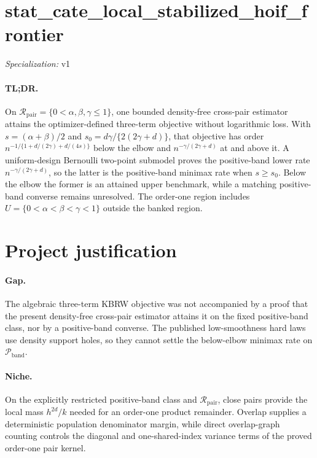 \documentclass{article}
\begin{document}
\sloppy

\section*{stat\_\allowbreak{}cate\_\allowbreak{}local\_\allowbreak{}stabilized\_\allowbreak{}hoif\_\allowbreak{}frontier}

\noindent\textit{Specialization:} v1\par

\paragraph{TL;DR.} On \(\mathcal R_{\mathrm{pair}}=\{0<\alpha,\beta,\gamma\leq1\}\), one bounded density-free cross-pair estimator attains the optimizer-defined three-term objective without logarithmic loss.  With \(s=(\alpha+\beta)/2\) and \(s_0=d\gamma/\{2(2\gamma+d)\}\), that objective has order \(n^{-1/\{1+d/(2\gamma)+d/(4s)\}}\) below the elbow and \(n^{-\gamma/(2\gamma+d)}\) at and above it.  A uniform-design Bernoulli two-point submodel proves the positive-band lower rate \(n^{-\gamma/(2\gamma+d)}\), so the latter is the positive-band minimax rate when \(s\geq s_0\).  Below the elbow the former is an attained upper benchmark, while a matching positive-band converse remains unresolved.  The order-one region includes \(U=\{0<\alpha<\beta<\gamma<1\}\) outside the banked region.

\section{Project justification}

\paragraph{Gap.} The algebraic three-term KBRW objective was not accompanied by a proof that the present density-free cross-pair estimator attains it on the fixed positive-band class, nor by a positive-band converse.  The published low-smoothness hard laws use density support holes, so they cannot settle the below-elbow minimax rate on \(\mathcal P_{\mathrm{band}}\).

\paragraph{Niche.} On the explicitly restricted positive-band class and \(\mathcal R_{\mathrm{pair}}\), close pairs provide the local mass \(h^{2d}/k\) needed for an order-one product remainder.  Overlap supplies a deterministic population denominator margin, while direct overlap-graph counting controls the diagonal and one-shared-index variance terms of the proved order-one pair kernel.
\end{document}
